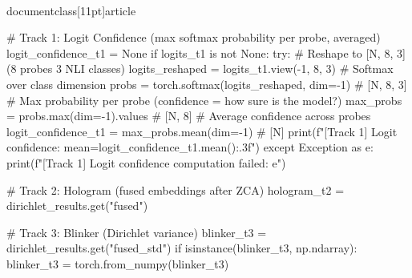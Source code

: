 \\documentclass[11pt]{article}
\begin{document}
\begin{CodeBlock}
                # Track 1: Logit Confidence (max softmax probability per probe, averaged)
                logit_confidence_t1 = None
                if logits_t1 is not None:
                    try:
                        # Reshape to [N, 8, 3] (8 probes  3 NLI classes)
                        logits_reshaped = logits_t1.view(-1, 8, 3)
                        # Softmax over class dimension
                        probs = torch.softmax(logits_reshaped, dim=-1)  # [N, 8, 3]
                        # Max probability per probe (confidence = how sure is the model?)
                        max_probs = probs.max(dim=-1).values  # [N, 8]
                        # Average confidence across probes
                        logit_confidence_t1 = max_probs.mean(dim=-1)  # [N]
                        print(f"[Track 1] Logit confidence: mean={logit_confidence_t1.mean():.3f}")
                    except Exception as e:
                        print(f"[Track 1] Logit confidence computation failed: {e}")

                # Track 2: Hologram (fused embeddings after ZCA)
                hologram_t2 = dirichlet_results.get("fused")

                # Track 3: Blinker (Dirichlet variance)
                blinker_t3 = dirichlet_results.get("fused_std")
                if isinstance(blinker_t3, np.ndarray):
                    blinker_t3 = torch.from_numpy(blinker_t3)


\end{CodeBlock}
\end{document}
